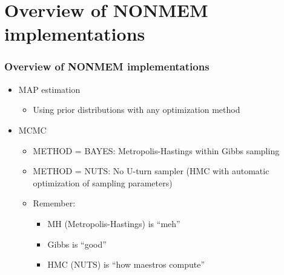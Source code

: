 \documentclass{beamer}
\begin{document}
  


\section{Overview of NONMEM implementations}

\begin{frame}
  \frametitle{Overview of NONMEM implementations}
  
  \begin{itemize}
  \item<1-> MAP estimation
    \begin{itemize}
    \item Using prior distributions with any optimization method
    \end{itemize}
  \item MCMC
    \begin{itemize}
    \item METHOD = BAYES: Metropolis-Hastings within Gibbs sampling
    \item METHOD = NUTS: No U-turn sampler (HMC with automatic
      optimization of sampling parameters)
    \item<2-> Remember:
      \begin{itemize}
        \item MH (Metropolis-Hastings) is ``meh''
        \item Gibbs is ``good''
        \item HMC (NUTS) is ``how maestros compute''
      \end{itemize}
    \end{itemize}
  \end{itemize}

\end{frame}
\end{document}
